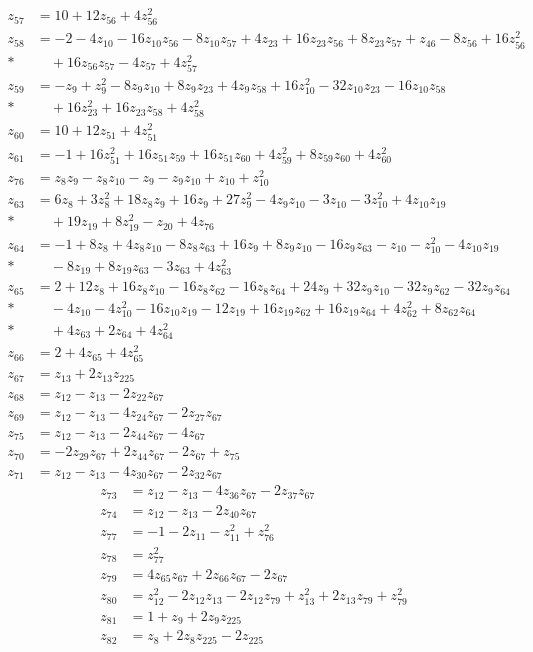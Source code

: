 \documentclass[11pt]{article}
\theoremstyle{remark}
\begin{document}
\begin{align*}
z_{57}&=10+12z_{56}+4z_{56}^{2}\\[3pt]
z_{58}&=-2-4z_{10}-16z_{10} z_{56}-8z_{10} z_{57}+4z_{23}+16z_{23} z_{56}+8z_{23} z_{57}+z_{46}-8z_{56}+16z_{56}^{2}\\*
&\quad{}+16z_{56} z_{57}-4z_{57}+4z_{57}^{2}\\[3pt]
z_{59}&=-z_{9}+z_{9}^{2}-8z_{9} z_{10}+8z_{9} z_{23}+4z_{9} z_{58}+16z_{10}^{2}-32z_{10} z_{23}-16z_{10} z_{58}\\*
&\quad{}+16z_{23}^{2}+16z_{23} z_{58}+4z_{58}^{2}\\[3pt]
z_{60}&=10+12z_{51}+4z_{51}^{2}\\[3pt]
z_{61}&=-1+16z_{51}^{2}+16z_{51} z_{59}+16z_{51} z_{60}+4z_{59}^{2}+8z_{59} z_{60}+4z_{60}^{2}\\[3pt]
z_{76}&=z_{8} z_{9}-z_{8} z_{10}-z_{9}-z_{9} z_{10}+z_{10}+z_{10}^{2}\\[3pt]
z_{63}&=6z_{8}+3z_{8}^{2}+18z_{8} z_{9}+16z_{9}+27z_{9}^{2}-4z_{9} z_{10}-3z_{10}-3z_{10}^{2}+4z_{10} z_{19}\\*
&\quad{}+19z_{19}+8z_{19}^{2}-z_{20}+4z_{76}\\[3pt]
z_{64}&=-1+8z_{8}+4z_{8} z_{10}-8z_{8} z_{63}+16z_{9}+8z_{9} z_{10}-16z_{9} z_{63}-z_{10}-z_{10}^{2}-4z_{10} z_{19}\\*
&\quad{}-8z_{19}+8z_{19} z_{63}-3z_{63}+4z_{63}^{2}
\end{align*}
\begin{align*}
z_{65}&=2+12z_{8}+16z_{8} z_{10}-16z_{8} z_{62}-16z_{8} z_{64}+24z_{9}+32z_{9} z_{10}-32z_{9} z_{62}-32z_{9} z_{64}\\*
&\quad{}-4z_{10}-4z_{10}^{2}-16z_{10} z_{19}-12z_{19}+16z_{19} z_{62}+16z_{19} z_{64}+4z_{62}^{2}+8z_{62} z_{64}\\*
&\quad{}+4z_{63}+2z_{64}+4z_{64}^{2}\\[3pt]
z_{66}&=2+4z_{65}+4z_{65}^{2}\\[3pt]
z_{67}&=z_{13}+2z_{13} z_{225}\\[3pt]
z_{68}&=z_{12}-z_{13}-2z_{22} z_{67}\\[3pt]
z_{69}&=z_{12}-z_{13}-4z_{24} z_{67}-2z_{27} z_{67}\\[3pt]
z_{75}&=z_{12}-z_{13}-2z_{44} z_{67}-4z_{67}\\[3pt]
z_{70}&=-2z_{29} z_{67}+2z_{44} z_{67}-2z_{67}+z_{75}\\[3pt]
z_{71}&=z_{12}-z_{13}-4z_{30} z_{67}-2z_{32} z_{67}
\end{align*}
\begin{align*}
z_{73}&=z_{12}-z_{13}-4z_{36} z_{67}-2z_{37} z_{67}\\[3pt]
z_{74}&=z_{12}-z_{13}-2z_{40} z_{67}\\[3pt]
z_{77}&=-1-2z_{11}-z_{11}^{2}+z_{76}^{2}\\[3pt]
z_{78}&=z_{77}^{2}\\[3pt]
z_{79}&=4z_{65} z_{67}+2z_{66} z_{67}-2z_{67}\\[3pt]
z_{80}&=z_{12}^{2}-2z_{12} z_{13}-2z_{12} z_{79}+z_{13}^{2}+2z_{13} z_{79}+z_{79}^{2}\\[3pt]
z_{81}&=1+z_{9}+2z_{9} z_{225}\\[3pt]
z_{82}&=z_{8}+2z_{8} z_{225}-2z_{225}
\end{align*}
\end{document}
